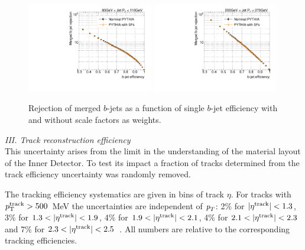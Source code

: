\begin{figure}[tp]
\centering
\includegraphics[width=0.49\textwidth]{FIGS/systematics/LlhoodKDE_ISO_BTagCalibTest_rejvseff080.pdf}
\includegraphics[width=0.49\textwidth]{FIGS/systematics/LlhoodKDE_ISO_BTagCalibTest_rejvseff200.pdf}
\caption{Rejection of merged $b$-jets as a function of single $b$-jet efficiency with and without scale factors as weights.}
\label{fig:btaggingSFsPerf}
\end{figure}



\vspace{3mm}
{ \em III. Track reconstruction efficiency}
\\[3mm]
This uncertainty arises from the limit in the understanding of the material layout of the Inner Detector. To test its impact a fraction of tracks determined from the track efficiency uncertainty was randomly removed.  %

The tracking efficiency systematics are given in bins of track $\eta$. For tracks with $p_{\rm{T}}^{\rm{track}} > 500$~MeV the uncertainties are independent of ${\emph{p}_{T}}$:  2\% for $|\eta^{\rm{track}}|<1.3$, 3\% for $1.3<|\eta^{\rm{track}}|<1.9$, 4\% for $1.9<|\eta^{\rm{track}}|<2.1$, 4\% for $2.1<|\eta^{\rm{track}}|<2.3$ and 7\% for $2.3<|\eta^{\rm{track}}|<2.5$~\cite{chargemultiplicity}. All numbers are relative to the corresponding tracking efficiencies.  

